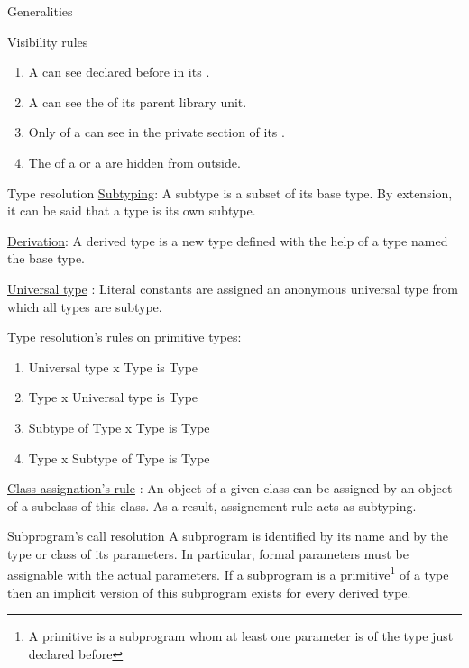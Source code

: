 \documentclass[a4paper]{prjdoc}
\begin{document}
\begin{asection}{Generalities}
\begin{asection} {Visibility rules}
        \begin{enumerate} 
        \item A  can see 
              declared before in its .    
        \item A  can see the  of its parent library unit.
        \item Only  of a  can see 
               in the private section of its .
        \item The  of a  or a  are hidden from outside.
        \end{enumerate}
     \end{asection} %
      
     \begin{asection}{Type resolution}
     \underline{Subtyping}: A subtype is a subset of its base type. By extension, it can be said that a type is its own subtype.
                     
     \underline{Derivation}: A derived type is a new type defined with the help of a type named the base type.     
   
     \underline{Universal type} : Literal constants are assigned an anonymous universal type from which all types are subtype.
   
     Type resolution's rules on primitive types:
        \begin{enumerate}
        \item Universal type x Type is Type
        \item Type x Universal type is Type
        \item Subtype of Type x Type is Type
        \item Type x Subtype of Type is Type          
        \end{enumerate}
   
     \underline{Class assignation's rule} : An object of a given class can be assigned by an object of a subclass of this class.
                                            As a result, assignement rule acts as subtyping.         
     \end{asection} %
   
     \begin{asection}{Subprogram's call resolution}
     A subprogram is identified by its name and by the type or class of its parameters.
     In particular, formal parameters must be assignable with the actual parameters.
     If a subprogram is a primitive\footnote{A primitive is a subprogram whom at least one parameter
     is of the type just declared before} of a type then an implicit version of this subprogram exists 
     for every derived type.      
     \end{asection} %


\end{asection}
\end{document}
